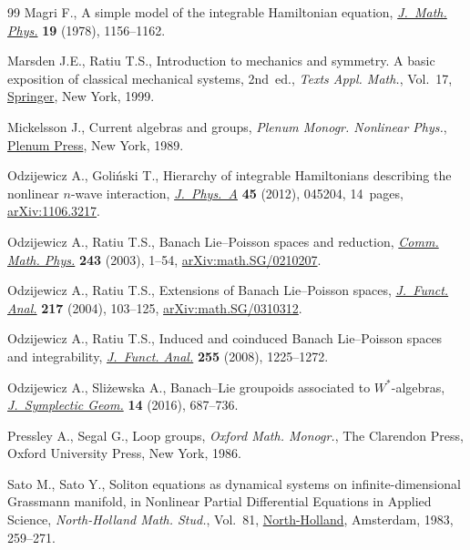 \begin{thebibliography}{99}
Magri F., A simple model of the integrable {H}amiltonian equation,
 \href{https://doi.org/10.1063/1.523777}{\textit{J.~Math. Phys.}} \textbf{19} (1978), 1156--1162.

Marsden J.E., Ratiu T.S., Introduction to mechanics and symmetry. A basic
 exposition of classical mechanical systems, 2nd~ed., \textit{Texts Appl. Math.},
 Vol.~17, \href{https://doi.org/10.1007/978-0-387-21792-5}{Springer}, New York, 1999.

Mickelsson J., Current algebras and groups, \textit{Plenum Monogr. Nonlinear Phys.},
 \href{https://doi.org/10.1007/978-1-4757-0295-8}{Plenum Press}, New York, 1989.

Odzijewicz A., Goli\'nski T., Hierarchy of integrable {H}amiltonians describing
 the nonlinear {$n$}-wave interaction, \href{https://doi.org/10.1088/1751-8113/45/4/045204}{\textit{J.~Phys.~A}} \textbf{45} (2012),
 045204, 14~pages, \href{https://arxiv.org/abs/1106.3217}{arXiv:1106.3217}.

Odzijewicz A., Ratiu T.S., Banach {L}ie--{P}oisson spaces and reduction,
 \href{https://doi.org/10.1007/s00220-003-0948-8}{\textit{Comm. Math. Phys.}} \textbf{243} (2003), 1--54,
 \href{https://arxiv.org/abs/math.SG/0210207}{arXiv:math.SG/0210207}.

Odzijewicz A., Ratiu T.S., Extensions of {B}anach {L}ie--{P}oisson spaces,
 \href{https://doi.org/10.1016/j.jfa.2004.02.012}{\textit{J.~Funct. Anal.}} \textbf{217} (2004), 103--125,
 \href{https://arxiv.org/abs/math.SG/0310312}{arXiv:math.SG/0310312}.

Odzijewicz A., Ratiu T.S., Induced and coinduced {B}anach {L}ie--{P}oisson
 spaces and integrability, \href{https://doi.org/10.1016/j.jfa.2008.06.001}{\textit{J.~Funct. Anal.}} \textbf{255} (2008),
 1225--1272.

Odzijewicz A., Sli\.{z}ewska A., Banach--{L}ie groupoids associated to
 {$W^*$}-algebras, \href{https://doi.org/10.4310/JSG.2016.v14.n3.a3}{\textit{J.~Symplectic Geom.}} \textbf{14} (2016), 687--736.

Pressley A., Segal G., Loop groups, \textit{Oxford Math. Monogr.}, The Clarendon Press,
 Oxford University Press, New York, 1986.

Sato M., Sato Y., Soliton equations as dynamical systems on
 infinite-dimensional {G}rassmann manifold, in Nonlinear {P}artial
 {D}ifferential {E}quations in {A}pplied {S}cience, \textit{North-Holland
 Math. Stud.}, Vol.~81, \href{https://doi.org/10.1016/S0304-0208(08)72096-6}{North-Holland}, Amsterdam, 1983, 259--271.


\end{thebibliography}
